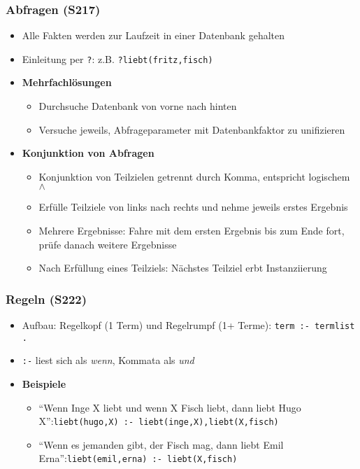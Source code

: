 \subsubsection{Abfragen (S217)}
\begin{itemize}
	\item Alle Fakten werden zur Laufzeit in einer Datenbank gehalten
	\item Einleitung per \texttt{?}: z.B. \texttt{?liebt(fritz,fisch)}
	\item \textbf{Mehrfachlösungen}
	\begin{itemize}
		\item Durchsuche Datenbank von vorne nach hinten
		\item Versuche jeweils, Abfrageparameter mit Datenbankfaktor zu unifizieren
	\end{itemize}
	\item \textbf{Konjunktion von Abfragen}
	\begin{itemize}
		\item Konjunktion von Teilzielen getrennt durch Komma, entspricht logischem \(\wedge\)
		\item Erfülle Teilziele von links nach rechts und nehme jeweils erstes Ergebnis
		\item Mehrere Ergebnisse: Fahre mit dem ersten Ergebnis bis zum Ende fort, prüfe danach weitere Ergebnisse
		\item Nach Erfüllung eines Teilziels: Nächstes Teilziel erbt Instanziierung
	\end{itemize}
\end{itemize}

\subsubsection{Regeln (S222)}
\begin{itemize}
	\item Aufbau: Regelkopf (1 Term) und Regelrumpf (1+ Terme): \texttt{term :- termlist .}
	\item \texttt{:-} liest sich als \textit{wenn}, Kommata als \textit{und}
	\item \textbf{Beispiele}
	\begin{itemize}
		\item "`Wenn Inge X liebt und wenn X Fisch liebt, dann liebt Hugo X"':\newline\texttt{liebt(hugo,X) :- liebt(inge,X),liebt(X,fisch)}
		\item "`Wenn es jemanden gibt, der Fisch mag, dann liebt Emil Erna"':\newline\texttt{liebt(emil,erna) :- liebt(X,fisch)}
	\end{itemize}
\end{itemize}

